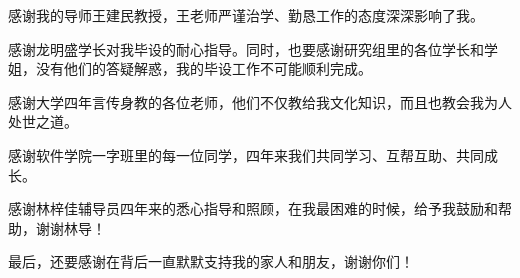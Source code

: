 
\begin{ack}
    感谢我的导师王建民教授，王老师严谨治学、勤恳工作的态度深深影响了我。
    
    感谢龙明盛学长对我毕设的耐心指导。同时，也要感谢研究组里的各位学长和学姐，没有他们的答疑解惑，我的毕设工作不可能顺利完成。
    
    感谢大学四年言传身教的各位老师，他们不仅教给我文化知识，而且也教会我为人处世之道。
    
    感谢软件学院一字班里的每一位同学，四年来我们共同学习、互帮互助、共同成长。
    
    感谢林梓佳辅导员四年来的悉心指导和照顾，在我最困难的时候，给予我鼓励和帮助，谢谢林导！
    
    最后，还要感谢在背后一直默默支持我的家人和朋友，谢谢你们！
\end{ack}
